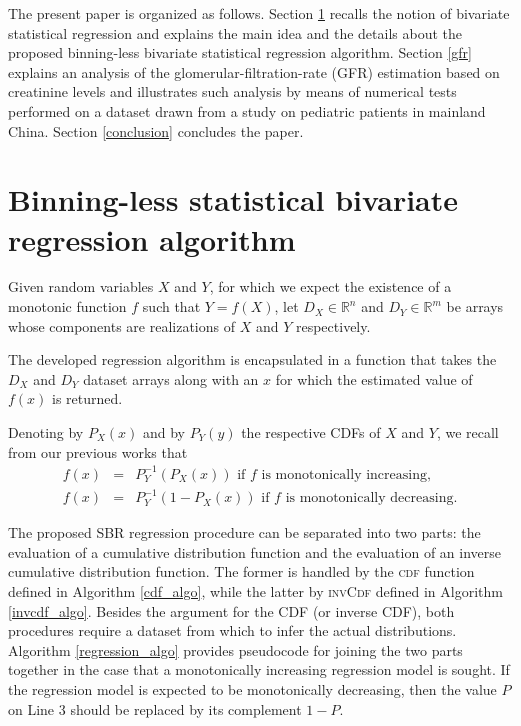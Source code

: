 \documentclass[10pt,final]{siamltex}
\begin{document}
The present paper is organized as follows. Section \ref{blsbr} recalls the notion of bivariate statistical regression and explains the main idea and the details about the proposed binning-less bivariate statistical regression algorithm. Section \ref{gfr} explains an analysis of the glomerular-filtration-rate (GFR) estimation based on creatinine levels and illustrates such analysis by means of numerical tests performed on a dataset drawn from a study on pediatric patients in mainland China. Section \ref{conclusion} concludes the paper.
%
\section{Binning-less statistical bivariate regression algorithm}\label{blsbr}
%
Given random variables $X$ and $Y$, for which we expect the existence of a monotonic function $f$ such that $Y=f(X)$, let $D_X \in \mathbb{R}^n$ and $D_Y \in \mathbb{R}^m$ be arrays whose components are realizations of $X$ and $Y$ respectively.

The developed regression algorithm is encapsulated in a function that takes the $D_X$ and $D_Y$ dataset arrays along with an $x$ for which the estimated value of $f(x)$ is returned.

Denoting by $P_X(x)$ and by $P_Y(y)$ the respective CDFs of $X$ and $Y$, we recall from our previous works \cite{fiori,fgl} that
%
\begin{eqnarray}
  f(x) & = & P_Y^{-1}(P_X(x)) \text{ if $f$ is monotonically increasing},\\
  f(x) & = & P_Y^{-1}(1-P_X(x)) \text{ if $f$ is monotonically decreasing}.
\end{eqnarray}
%

The proposed SBR regression procedure can be separated into two parts: the evaluation of a cumulative distribution function and the evaluation of an inverse cumulative distribution function. The former is handled by the \textsc{cdf} function defined in Algorithm \ref{cdf_algo}, while the latter by \textsc{invCdf} defined in Algorithm \ref{invcdf_algo}. Besides the argument for the CDF (or inverse CDF), both procedures require a dataset from which to infer the actual distributions. Algorithm \ref{regression_algo} provides pseudocode for joining the two parts together in the case that a monotonically increasing regression model is sought. If the regression model is expected to be monotonically decreasing, then the value $P$ on Line 3 should be replaced by its complement $1-P$.
\end{document}
